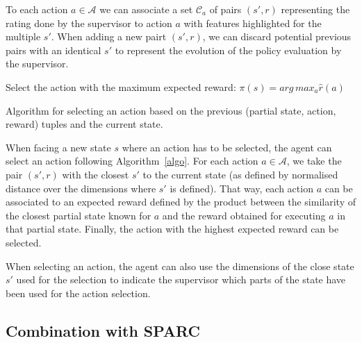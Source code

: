 \documentclass[letterpaper]{article} %
\begin{document}
To each action
$a \in \mathcal{A}$ we can associate a set $\mathcal{C}_{a}$ of pairs $(s',r)$
representing the rating done by the supervisor to action $a$ with features
highlighted for the multiple $s'$. When adding a new pairt $(s',r)$, we can discard potential
previous pairs with an identical $s'$ to represent the evolution of the policy
evaluation by the supervisor.

\begin{algorithm}
    \DontPrintSemicolon
    Select the action with the maximum expected reward:
    $\pi(s) = arg\, max_{a} \hat{r}(a)$

    \caption{Algorithm for selecting an action based on the previous
    (partial state, action, reward) tuples and the current state.}
    \label{algo}
\end{algorithm}


When facing a new state $s$ where an action has to be
selected, the agent can select an action following Algorithm~\ref{algo}. For
each action $a \in \mathcal{A}$, we take the pair $(s',r)$ with the closest $s'$
to the current state (as defined by normalised distance over the dimensions
where $s'$ is defined). That way, each action $a$ can be associated to an
expected reward defined by the product between the similarity of the closest
partial state known for $a$ and the reward obtained for executing $a$ in that partial state.
Finally, the action with the highest expected reward can be selected.

When selecting an action, the agent can also use
the dimensions of the close state $s'$ used for the selection to indicate the
supervisor which parts of the state have been used for the action selection.

\subsection{Combination with SPARC}
\end{document}
